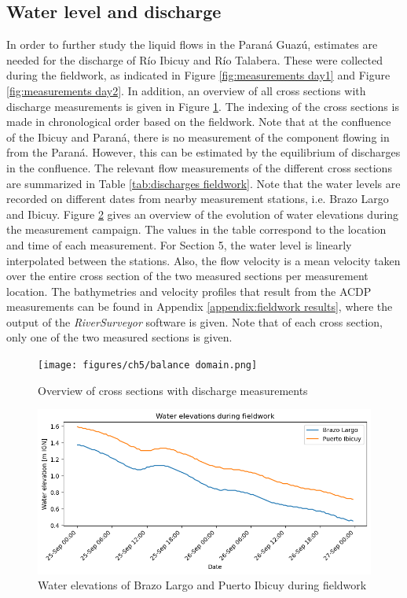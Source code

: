 \subsection{Water level and discharge}
In order to further study the liquid flows in the Paraná Guazú, estimates are needed for the discharge of Río Ibicuy and Río Talabera. These were collected during the fieldwork, as indicated in Figure \ref{fig:measurements day1} and Figure \ref{fig:measurements day2}. In addition, an overview of all cross sections with discharge measurements is given in Figure \ref{fig:cross section domain}. The indexing of the cross sections is made in chronological order based on the fieldwork. Note that at the confluence of the Ibicuy and Paraná, there is no measurement of the component flowing in from the Paraná. However, this can be estimated by the equilibrium of discharges in the confluence. The relevant flow measurements of the different cross sections are summarized in Table \ref{tab:discharges fieldwork}. Note that the water levels are recorded on different dates from nearby measurement stations, i.e. Brazo Largo and Ibicuy. Figure \ref{fig:water elevations fieldwork} gives an overview of the evolution of water elevations during the measurement campaign. The values in the table correspond to the location and time of each measurement. For Section 5, the water level is linearly interpolated between the stations. Also, the flow velocity is a mean velocity taken over the entire cross section of the two measured sections per measurement location. The bathymetries and velocity profiles that result from the ACDP measurements can be found in Appendix \ref{appendix:fieldwork results}, where the output of the \textit{RiverSurveyor} software is given. Note that of each cross section, only one of the two measured sections is given. 

\begin{figure}
    \centering
    \texttt{[image: figures/ch5/balance domain.png]}
    \caption{Overview of cross sections with discharge measurements}
    \label{fig:cross section domain}
\end{figure}

\begin{figure}
    \centering
    \includegraphics[width=1\linewidth]{figures/ch6/water elevations fieldwork.png}
    \caption{Water elevations of Brazo Largo and Puerto Ibicuy during fieldwork}
    \label{fig:water elevations fieldwork}
\end{figure}

